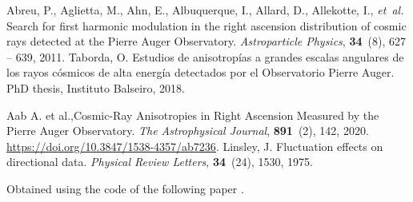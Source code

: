 \documentclass[12pt, doublespace, oneside]{article}
\begin{document}
\begin{thebibliography}{9}
    
  Abreu, P., Aglietta, M., Ahn, E., Albuquerque, I., Allard, D., Allekotte, I.,
    \emph{et~al.}
   Search for first harmonic modulation in the right ascension
    distribution of cosmic rays detected at the Pierre Auger Observatory.
   \emph{Astroparticle Physics}, \textbf{34}~(8), 627 -- 639, 2011.
    Taborda, O. {Estudios de anisotropías a grandes escalas angulares de los rayos
  cósmicos de alta energía detectados por el Observatorio Pierre Auger}. PhD thesis, Instituto Balseiro, 2018. 
   
    {Aab A. et al.},{Cosmic-Ray Anisotropies in Right Ascension Measured by the {Pierre   Auger Observatory}}.
    \emph{The Astrophysical Journal}, \textbf{891}~(2), 142, 2020. \url{https://doi.org/10.3847/1538-4357/ab7236}.
    Linsley, J.
    Fluctuation effects on directional data.
     \emph{Physical Review Letters}, \textbf{34}~(24), 1530, 1975.

    
    {Obtained using the code of the following paper \cite{Aab_2020}}.
\end{thebibliography}
    
\end{document}
